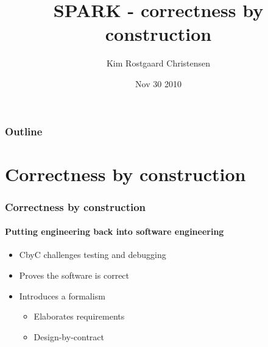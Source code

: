 \documentclass[presentation]{beamer}   %
\begin{document}

\author{Kim Rostgaard Christensen}
\title{SPARK - correctness by construction}

\date{Nov 30 2010}

\begin{frame}
  \maketitle
\end{frame}

\begin{frame}
  \frametitle{Outline}
  \tableofcontents
\end{frame}

\section{Correctness by construction}
\begin{frame}
  \frametitle{Correctness by construction}
  \framesubtitle{Putting engineering back into software engineering}
  \begin{itemize}
    \item CbyC challenges testing and debugging
    \item Proves the software is correct
    \item Introduces a formalism
      \begin{itemize}
        \item Elaborates requirements 
        \item Design-by-contract
      \end{itemize}
  \end{itemize}
\end{frame}
\end{document}
